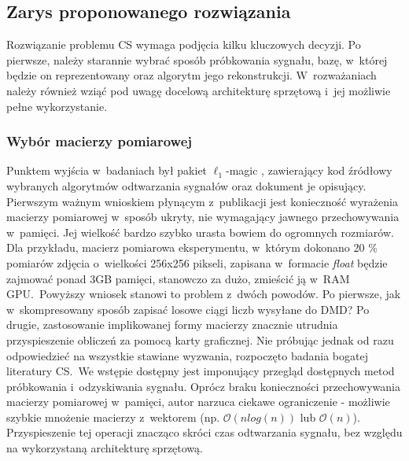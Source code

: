 \subsection{Zarys proponowanego rozwiązania}
Rozwiązanie problemu CS wymaga podjęcia kilku kluczowych decyzji. Po pierwsze, należy starannie wybrać sposób próbkowania sygnału, bazę, w~której będzie on reprezentowany oraz algorytm jego rekonstrukcji. W~rozważaniach należy również wziąć pod uwagę docelową architekturę sprzętową i~jej możliwie pełne wykorzystanie.
\subsubsection{Wybór macierzy pomiarowej}
Punktem wyjścia w~badaniach był pakiet $\ell_1$-magic \cite{SinglePixelCameraCode}, zawierający kod źródłowy wybranych algorytmów odtwarzania sygnałów oraz dokument \cite{L1MagicNotes}  je opisujący. Pierwszym ważnym wnioskiem płynącym z~publikacji jest konieczność wyrażenia macierzy pomiarowej w~sposób ukryty, nie wymagający jawnego przechowywania w~pamięci. Jej wielkość bardzo szybko urasta bowiem do ogromnych rozmiarów. Dla przykładu, macierz pomiarowa eksperymentu, w~którym dokonano 20 \% pomiarów zdjęcia o~wielkości 256x256 pikseli, zapisana w~formacie \textit{float} będzie zajmować ponad 3GB pamięci, stanowczo za dużo, zmieścić ją w~RAM GPU.~Powyższy wniosek stanowi to problem z~dwóch powodów. Po pierwsze, jak w~skompresowany sposób zapisać losowe ciągi liczb wysyłane do DMD? Po drugie, zastosowanie implikowanej formy macierzy znacznie utrudnia przyspieszenie obliczeń za pomocą karty graficznej. Nie próbując jednak od razu odpowiedzieć na wszystkie stawiane wyzwania, rozpoczęto badania bogatej literatury CS.~We wstępie \cite{Fountoulakis2012} dostępny jest imponujący przegląd dostępnych metod próbkowania i~odzyskiwania sygnału. Oprócz braku konieczności przechowywania macierzy pomiarowej w~pamięci, autor narzuca ciekawe ograniczenie - możliwie szybkie mnożenie macierzy z~wektorem (np. $\mathcal{O}(nlog(n))$ lub $\mathcal{O}(n)$).  Przyspieszenie tej operacji znacząco skróci czas odtwarzania sygnału, bez względu na wykorzystaną architekturę sprzętową. 
\newline{}
